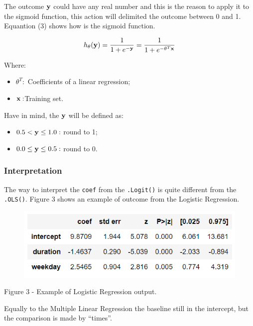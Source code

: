 \documentclass[]{book}
\providecommand{\tightlist}{%
  \setlength{\itemsep}{0pt}\setlength{\parskip}{0pt}}
\begin{document}
The outcome \(\bold y\) could have any real number and this is the
reason to apply it to the sigmoid function, this action will delimited
the outcome between 0 and 1. Equantion (3) shows how is the sigmoid
function.

\[h_{\theta}(\bold y) = \frac{1}{1 + e^{- \bold y}} = \frac{1}{1 + e^{-\theta^T \bold x}}\]

Where:

\begin{itemize}
\tightlist
\item
  \(\theta^T:\) Coefficients of a linear regression;
\item
  \(\bold x:\)Training set.
\end{itemize}

Have in mind, the \(\bold y\) will be defined as:

\begin{itemize}
\tightlist
\item
  \(0.5 < \bold y \leq 1.0:\) round to 1;
\item
  \(0.0 \leq \bold y \leq 0.5:\) round to 0.
\end{itemize}

\subsubsection*{Interpretation}\label{interpretation-2}

The way to interpret the \texttt{coef} from the \texttt{.Logit()} is
quite different from the \texttt{.OLS()}. Figure 3 shows an example of
outcome from the Logistic Regression.

\begin{figure}
\centering
\includegraphics{01-img/c4_l16_03.png}
\caption{}
\end{figure}

Figure 3 - Example of Logistic Regression output.

Equally to the Multiple Linear Regression the baseline still in the
intercept, but the comparison is made by ``times''.
\end{document}
